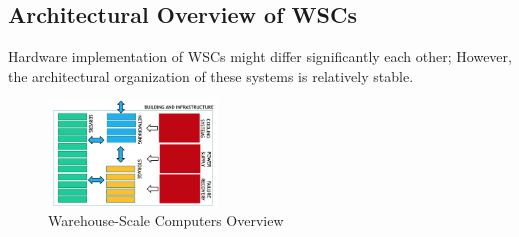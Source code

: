 \documentclass[10pt, oneside]{article}
\begin{document}
\subsection{Architectural Overview of WSCs}
Hardware implementation of WSCs might differ significantly each other; However, the architectural organization of these systems is relatively stable.
\begin{figure}[H]
    \begin{center}
    \includegraphics[width=0.4\textwidth]{img/img6.png}
    \caption{Warehouse-Scale Computers Overview}
    \label{fig:WSCs overview}
    \end{center}
\end{figure}
\end{document}
